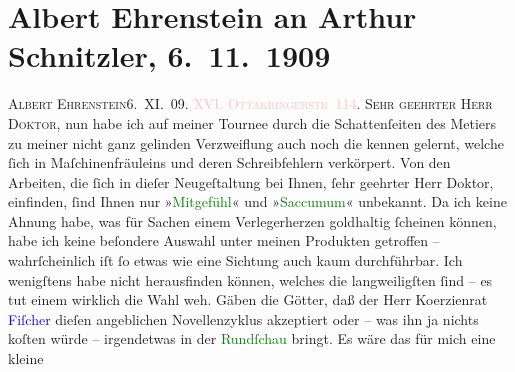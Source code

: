 

               \section[Albert Ehrenstein an Arthur Schnitzler, 6. 11. 1909]{ Albert Ehrenstein an Arthur Schnitzler, 6. 11. 1909}\nopagebreak{}\rehead{ }\normalsize\beginnumbering{} \toendnotes[C]{\smallbreak\pagebreak[2]} 
\pstart
           {\pb}\textsc{Albert Ehrenstein}\hfill 6. XI. 09.
                        \pend
           \pstart
           \textsc{\textcolor{pink}{XVI. Ottakringerstr 114}{}\ledrightnote{\textcolor{pink}{Ottakringerstraße}}.}\pend
           \pstart{}\textsc{Sehr geehrter Herr Doktor,}\pend\pstart
           nun habe ich auf meiner Tournee durch die Schattenſeiten des Metiers zu meiner
                    nicht ganz gelinden Verzweiflung auch noch die kennen gelernt, welche ſich in
                    Maſchinenfräuleins und deren Schreibfehlern verkörpert. Von den Arbeiten, die
                    ſich in dieſer Neugeſtaltung bei Ihnen, ſehr geehrter Herr Doktor, einfinden,
                    ſind Ihnen nur »\textcolor{green}{Mitgefühl}{}\ledrightnote{\textcolor{green}{Mitgefühl}}« und »\textcolor{green}{Saccumum}{}\ledrightnote{\textcolor{green}{Saccumum}}« unbekannt.\pend
           \pstart
           Da ich keine Ahnung habe, was für Sachen einem Verlegerherzen goldhaltig ſcheinen
                    können, habe ich keine beſondere Auswahl {\pb}unter meinen
                    Produkten getroffen – wahrſcheinlich iſt ſo etwas wie eine Sichtung auch kaum
                    durchführbar. Ich wenigſtens habe nicht herausfinden können, welches die
                    langweiligſten ſind – es tut einem wirklich die Wahl weh. Gäben die Götter, daß
                    der Herr Ko{\geminationm}erzienrat \textcolor{blue}{Fiſcher}{}\ledrightnote{\textcolor{blue}{Samuel Fischer}} dieſen angeblichen Novellenzyklus akzeptiert oder
                    – was ihn ja nichts koſten würde – irgendetwas in der \textcolor{green}{Rundſchau}{}\ledrightnote{\textcolor{green}{Die neue Rundschau}} bringt. Es wäre das für mich eine kleine
